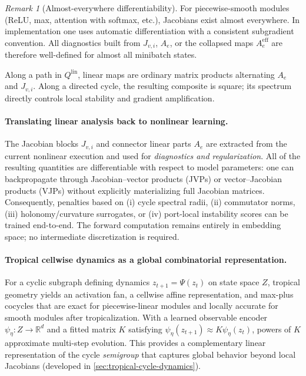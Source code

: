 \documentclass[11pt]{article}
\theoremstyle{definition}
\theoremstyle{plain}
\theoremstyle{remark}
\newtheorem{remark}{Remark}[section]
\newcommand{\R}{\mathbb{R}}
\begin{document}
\begin{remark}[Almost-everywhere differentiability]
For piecewise-smooth modules (ReLU, max, attention with softmax, etc.), Jacobians exist almost everywhere.
In implementation one uses automatic differentiation with a consistent subgradient convention.
All diagnostics built from $J_{v,i}$, $A_e$, or the collapsed maps $A_e^{\mathrm{eff}}$ are therefore well-defined for almost all minibatch states.
\end{remark}

Along a path in $Q^{\mathrm{lin}}$, linear maps are ordinary matrix products alternating $A_e$ and $J_{v,i}$.
Along a directed cycle, the resulting composite is square; its spectrum directly controls local stability and gradient amplification.

\paragraph{Translating linear analysis back to nonlinear learning.}
The Jacobian blocks $J_{v,i}$ and connector linear parts $A_e$ are extracted from the current nonlinear execution and used for \emph{diagnostics and regularization}.
All of the resulting quantities are differentiable with respect to model parameters:
one can backpropagate through Jacobian--vector products (JVPs) or vector--Jacobian products (VJPs) without explicitly materializing full Jacobian matrices.
Consequently, penalties based on (i) cycle spectral radii, (ii) commutator norms, (iii) holonomy/curvature surrogates, or (iv) port-local instability scores can be trained end-to-end.
The forward computation remains entirely in embedding space; no intermediate discretization is required.

\paragraph{Tropical cellwise dynamics as a global combinatorial representation.}
For a cyclic subgraph defining dynamics $z_{t+1}=\Psi(z_t)$ on state space $Z$, tropical geometry yields an activation fan, a cellwise affine representation, and max-plus cocycles that are exact for piecewise-linear modules and locally accurate for smooth modules after tropicalization.
With a learned observable encoder $\psi_\eta:Z\to\R^d$ and a fitted matrix $K$ satisfying $\psi_\eta(z_{t+1})\approx K\psi_\eta(z_t)$, powers of $K$ approximate multi-step evolution.
This provides a complementary linear representation of the cycle \emph{semigroup} that captures global behavior beyond local Jacobians (developed in \cref{sec:tropical-cycle-dynamics}).
\end{document}
